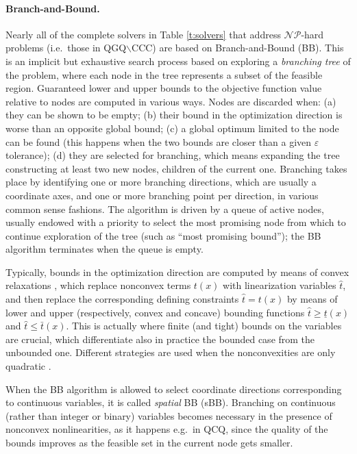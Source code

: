 \paragraph{Branch-and-Bound.}
%
Nearly all of the complete solvers in Table \ref{t:solvers} that address $\mathcal{NP}$-hard problems (i.e.~those in QGQ$\smallsetminus$CCC) are based on Branch-and-Bound (BB). This is an implicit but exhaustive search process based on exploring a \emph{branching tree} of the problem, where each node in the tree represents a subset of the feasible region. Guaranteed lower and upper bounds to the objective function value relative to nodes are computed in various ways. Nodes are discarded when: (a) they can be shown to be empty; (b) their bound in the optimization direction is worse than an opposite global bound; (c) a global optimum limited to the node can be found (this happens when the two bounds are closer than a given $\varepsilon$ tolerance); (d) they are selected for branching, which means expanding the tree constructing at least two new nodes, children of the current one. Branching takes place by identifying one or more branching directions, which are usually a coordinate axes, and one or more branching point per direction, in various common sense fashions. The algorithm is driven by a queue of active nodes, usually endowed with a priority to select the most promising node from which to continue exploration of the tree (such as ``most promising bound''); the BB algorithm terminates when the queue is empty.

Typically, bounds in the optimization direction are computed by means of convex relaxations \cite{mccormick,couenne}, which replace nonconvex terms $t(x)$ with linearization variables $\hat{t}$, and then replace the corresponding defining constraints $\hat{t} = t(x)$ by means of lower and upper (respectively, convex and concave) bounding functions $\hat{t} \ge \underline{t}(x)$ and $\hat{t} \le\bar{t}(x)$. This is actually where finite (and tight) bounds on the variables are crucial, which differentiate also in practice the bounded case from the unbounded one. Different strategies are used when the nonconvexities are only quadratic \cite{glomiqo,bliek}.

When the BB algorithm is allowed to select coordinate directions corresponding to continuous variables, it is called {\it spatial} BB (sBB). Branching on continuous (rather than integer or binary) variables becomes necessary in the presence of nonconvex nonlinearities, as it happens e.g.~in QCQ, since the quality of the bounds improves as the feasible set in the current node gets smaller.

